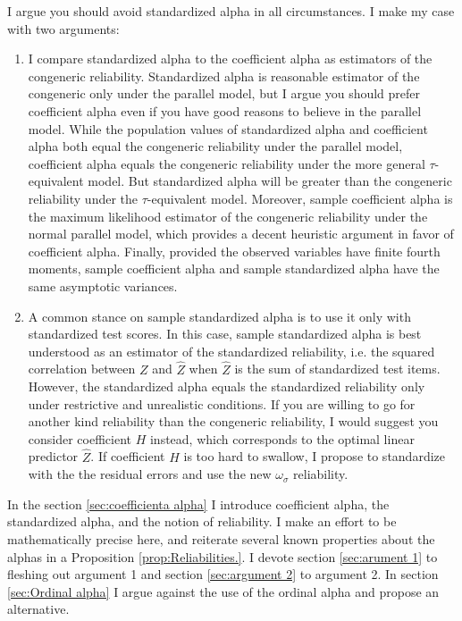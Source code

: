 \documentclass[twoside]{article}
\begin{document}
I argue you should avoid standardized alpha in all circumstances. I make my case with two arguments:

\begin{enumerate}[label=\arabic*.]
\item I compare standardized alpha to the coefficient alpha as estimators of the congeneric reliability. Standardized alpha is reasonable estimator of the congeneric only under the parallel model, but I argue you should prefer coefficient alpha even if you have good reasons to believe in the parallel model. While the population values of standardized alpha and coefficient alpha both equal the congeneric reliability under the parallel model, coefficient alpha equals the congeneric reliability under the more general $\tau$-equivalent model. But standardized alpha will be greater than the congeneric reliability under the $\tau$-equivalent model. Moreover, sample coefficient alpha is the maximum likelihood estimator of the congeneric reliability under the normal parallel model, which provides a decent heuristic argument in favor of coefficient alpha. Finally, provided the observed variables have finite fourth moments, sample coefficient alpha and sample standardized alpha have the same asymptotic variances. 

\item A common stance on sample standardized alpha is to use it only with standardized test scores. In this case, sample standardized alpha is best understood as an estimator of the standardized reliability, i.e. the squared correlation between $Z$ and $\hat{Z}$ when $\hat{Z}$ is the sum of standardized test items. However, the standardized alpha equals the standardized reliability only under restrictive and unrealistic conditions. If you are willing to go for another kind reliability than the congeneric reliability, I would suggest you consider coefficient $H$ instead, which corresponds to the optimal linear predictor $\hat{Z}$. If coefficient $H$ is too hard to swallow, I propose to standardize with the the residual errors and use the new $\omega_\sigma$ reliability.
\end{enumerate}

In the section \ref{sec:coefficienta alpha} I introduce coefficient alpha, the standardized alpha, and the notion of reliability. I make an effort to be mathematically precise here, and reiterate several known properties about the alphas in a Proposition \ref{prop:Reliabilities.}. I devote section \ref{sec:arument 1} to fleshing out argument 1 and section \ref{sec:argument 2} to argument 2. In section \ref{sec:Ordinal alpha} I argue against the use of the ordinal alpha \citep{Zumbo2007-ap} and propose an alternative.
\end{document}
